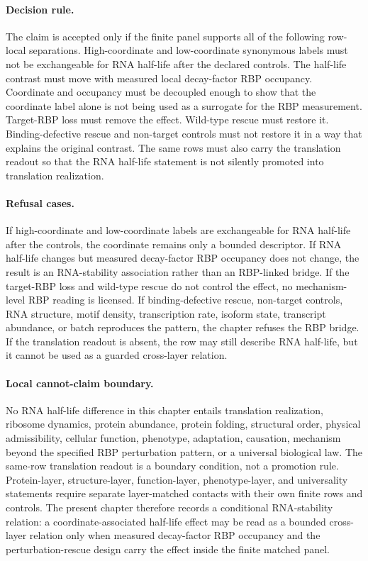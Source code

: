 \paragraph{Decision rule.}
The claim is accepted only if the finite panel supports all of the following row-local separations.  High-coordinate and low-coordinate synonymous labels must not be exchangeable for RNA half-life after the declared controls.  The half-life contrast must move with measured local decay-factor RBP occupancy.  Coordinate and occupancy must be decoupled enough to show that the coordinate label alone is not being used as a surrogate for the RBP measurement.  Target-RBP loss must remove the effect.  Wild-type rescue must restore it.  Binding-defective rescue and non-target controls must not restore it in a way that explains the original contrast.  The same rows must also carry the translation readout so that the RNA half-life statement is not silently promoted into translation realization.

\paragraph{Refusal cases.}
If high-coordinate and low-coordinate labels are exchangeable for RNA half-life after the controls, the coordinate remains only a bounded descriptor.  If RNA half-life changes but measured decay-factor RBP occupancy does not change, the result is an RNA-stability association rather than an RBP-linked bridge.  If the target-RBP loss and wild-type rescue do not control the effect, no mechanism-level RBP reading is licensed.  If binding-defective rescue, non-target controls, RNA structure, motif density, transcription rate, isoform state, transcript abundance, or batch reproduces the pattern, the chapter refuses the RBP bridge.  If the translation readout is absent, the row may still describe RNA half-life, but it cannot be used as a guarded cross-layer relation.

\paragraph{Local cannot-claim boundary.}
No RNA half-life difference in this chapter entails translation realization, ribosome dynamics, protein abundance, protein folding, structural order, physical admissibility, cellular function, phenotype, adaptation, causation, mechanism beyond the specified RBP perturbation pattern, or a universal biological law.  The same-row translation readout is a boundary condition, not a promotion rule.  Protein-layer, structure-layer, function-layer, phenotype-layer, and universality statements require separate layer-matched contacts with their own finite rows and controls.  The present chapter therefore records a conditional RNA-stability relation: a coordinate-associated half-life effect may be read as a bounded cross-layer relation only when measured decay-factor RBP occupancy and the perturbation-rescue design carry the effect inside the finite matched panel.
